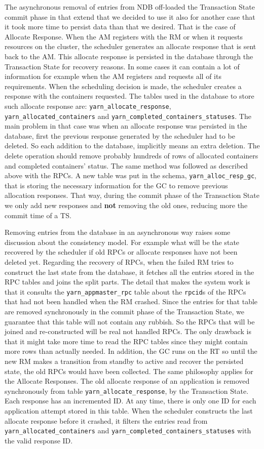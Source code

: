 The asynchronous removal of entries from NDB off-loaded the Transaction
State commit phase in that extend that we decided to use it also for
another case that it took more time to persist data than that we
desired. That is the case of Allocate Response. When the AM registers
with the RM or when it requests resources on the cluster, the
scheduler generates an allocate response that is sent back to the
AM. This allocate response is persisted in the database through the
Transaction State for recovery reasons. In some cases it can contain a
lot of information for example when the AM registers and requests all
of its requirements. When the scheduling decision is made, the scheduler creates a response with the
containers requested. The tables used in the database to store such
allocate response are: \texttt{yarn\_allocate\_response},
\texttt{yarn\_allocated\_containers} and
\texttt{yarn\_completed\_containers\_statuses}. The main problem in
that case was when an allocate response was persisted in the database, first
the previous response generated by the scheduler had to be deleted.
So each addition to the database, implicitly means an extra
deletion. The delete operation should remove probably hundreds of
rows of allocated containers and completed containers' status. The
same method was followed as described above with the RPCs. A new table
was put in the schema, \texttt{yarn\_alloc\_resp\_gc}, that is
storing the necessary information for the GC to remove previous
allocation responses. That way, during the commit phase of the
Transaction State we only add new responses and \textbf{not} removing
the old ones, reducing more the commit time of a TS.

Removing entries from the database in an asynchronous way raises some
discussion about the consistency model. For example what will be the
state recovered by the scheduler if old RPCs or allocate responses
have not been deleted yet. Regarding the recovery of RPCs, when the
failed RM tries to construct the last state from the database, it
fetches all the entries stored in the RPC tables and joins the split
parts. The detail that makes the system work is that it consults the
\texttt{yarn\_appmaster\_rpc} table about the \texttt{rpcid}s of the
RPCs that had not been handled when the RM crashed. Since the entries
for that table are removed synchronously in the commit phase of the
Transaction State, we guarantee that this table will not contain any
rubbish. So the RPCs that will be joined and re-constructed will be
real not handled RPCs. The only drawback is that it might take more
time to read the RPC tables since they might contain more rows than
actually needed. In addition, the GC runs on the RT so until the new
RM makes a transition from standby to active and recover the persisted
state, the old RPCs would have been collected. The same philosophy
applies for the Allocate Responses. The old allocate response of an
application is removed synchronously from table
\texttt{yarn\_allocate\_response}, by the Transaction State. Each
response has an incremented ID. At any time, there is only one ID for
each application attempt stored in this table. When the scheduler
constructs the last allocate response before it crashed, it filters
the entries read from \texttt{yarn\_allocated\_containers} and
\texttt{yarn\_completed\_containers\_statuses} with the valid response ID.